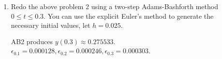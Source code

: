 \documentclass[10pt]{report}
\begin{document}
\begin{enumerate}
	\item 
	Redo the above problem 2 using a two-step Adams-Bashforth method
	$0 \le t \le 0.3$. You can use the explicit Euler's method to generate the necessary initial values, let $h=0.025$.
	
	AB2 produces $y(0.3)\approx 0.275533$. $\epsilon_{0.1} = 0.000128, \epsilon_{0.2} = 0.000246, \epsilon_{0.3} = 0.000303$.
\end{enumerate}
\end{document}
